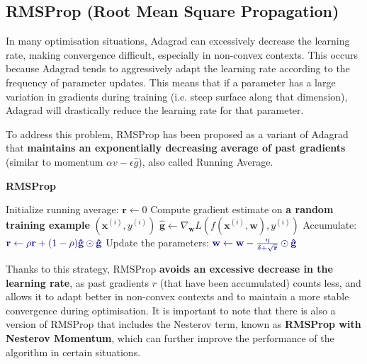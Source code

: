 \subsection{RMSProp (Root Mean Square Propagation)}

In many optimisation situations, Adagrad can excessively decrease the learning rate, making convergence difficult, especially in non-convex contexts. This occurs because Adagrad tends to aggressively adapt the learning rate according to the frequency of parameter updates. This means that if a parameter has a large variation in gradients during training (i.e. steep surface along that dimension), Adagrad will drastically reduce the learning rate for that parameter.

To address this problem, RMSProp has been proposed as a variant of Adagrad that \textbf{maintains an exponentially decreasing average of past gradients} (similar to momentum $\alpha v -\epsilon\hat{g}$), also called Running Average.

\begin{algorithm}
\renewcommand\thealgorithm{}
\caption{\textbf{\textcolor{mygreen}{RMSProp}}}
\begin{algorithmic}[1]
\STATE Initialize running average: $\mathbf{r} \leftarrow 0$
\STATE Compute gradient estimate on \textbf{\textcolor{myred}{a random training example}} $(\mathbf{x}^{(i)}, y^{(i)})$
\STATE $\mathbf{\hat{g}} \leftarrow \nabla_{\mathbf{w}} L(f(\mathbf{x}^{(i)},\mathbf{w}), y^{(i)})$
\STATE Accumulate:
$\textcolor{mybluee}{\mathbf{r} \leftarrow \rho \mathbf{r} + (1 - \rho) \mathbf{\hat{g}} \odot \mathbf{\hat{g}}}$
\STATE Update the parameters:
$\textcolor{mybluee}{\mathbf{w} \leftarrow \mathbf{w} - \frac{\eta}{\delta + \sqrt{\mathbf{r}}} \odot \mathbf{\hat{g}}}$
\ENDWHILE
\end{algorithmic}
\end{algorithm}

Thanks to this strategy, RMSProp \textbf{avoids an excessive decrease in the learning rate}, as past gradients $r$ (that have been accumulated) counts less, and allows it to adapt better in non-convex contexts and to maintain a more stable convergence during optimisation. It is important to note that there is also a version of RMSProp that includes the Nesterov term, known as \textbf{RMSProp with Nesterov Momentum}, which can further improve the performance of the algorithm in certain situations.



